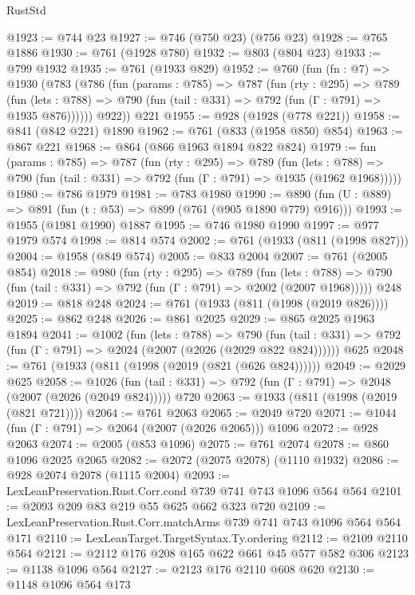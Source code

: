 \begin{lexlean}{RustStd}
\begin{coremodule}
@1923 := @744 @23
@1927 := @746 (@750 @23) (@756 @23)
@1928 := @765 @1886
@1930 := @761 (@1928 @780)
@1932 := @803 (@804 @23)
@1933 := @799 @1932
@1935 := @761 (@1933 @829)
@1952 := @760
    (fun (fn : @7) =>
    @1930
      (@783
        (@786
          (fun (params : @785) =>
          @787
            (fun (rty : @295) =>
            @789
              (fun (lets : @788) =>
              @790 (fun (tail : @331) => @792 (fun (Γ : @791) => @1935 @876))))))
        @922))
    @221
@1955 := @928 (@1928 (@778 @221))
@1958 := @841 (@842 @221) @1890
@1962 := @761 (@833 (@1958 @850) @854)
@1963 := @867 @221
@1968 := @864 (@866 @1963 @1894 @822 @824)
@1979 := fun (params : @785) =>
  @787
    (fun (rty : @295) =>
    @789
      (fun (lets : @788) =>
      @790 (fun (tail : @331) => @792 (fun (Γ : @791) => @1935 (@1962 @1968)))))
@1980 := @786 @1979
@1981 := @783 @1980
@1990 := @890 (fun (U : @889) => @891 (fun (t : @53) => @899 (@761 (@905 @1890 @779) @916)))
@1993 := @1955 (@1981 @1990) @1887
@1995 := @746 @1980 @1990
@1997 := @977 @1979 @574
@1998 := @814 @574
@2002 := @761 (@1933 (@811 (@1998 @827)))
@2004 := @1958 (@849 @574)
@2005 := @833 @2004
@2007 := @761 (@2005 @854)
@2018 := @980
    (fun (rty : @295) =>
    @789
      (fun (lets : @788) =>
      @790 (fun (tail : @331) => @792 (fun (Γ : @791) => @2002 (@2007 @1968)))))
    @248
@2019 := @818 @248
@2024 := @761 (@1933 (@811 (@1998 (@2019 @826))))
@2025 := @862 @248
@2026 := @861 @2025
@2029 := @865 @2025 @1963 @1894
@2041 := @1002
    (fun (lets : @788) =>
    @790 (fun (tail : @331) => @792 (fun (Γ : @791) => @2024 (@2007 (@2026 (@2029 @822 @824))))))
    @625
@2048 := @761 (@1933 (@811 (@1998 (@2019 (@821 (@626 @824))))))
@2049 := @2029 @625
@2058 := @1026
    (fun (tail : @331) => @792 (fun (Γ : @791) => @2048 (@2007 (@2026 (@2049 @824)))))
    @720
@2063 := @1933 (@811 (@1998 (@2019 (@821 @721))))
@2064 := @761 @2063
@2065 := @2049 @720
@2071 := @1044 (fun (Γ : @791) => @2064 (@2007 (@2026 @2065))) @1096
@2072 := @928 @2063
@2074 := @2005 (@853 @1096)
@2075 := @761 @2074
@2078 := @860 @1096 @2025 @2065
@2082 := @2072 (@2075 @2078) (@1110 @1932)
@2086 := @928 @2074 @2078 (@1115 @2004)
@2093 := LexLeanPreservation.Rust.Corr.cond @739 @741 @743 @1096 @564 @564
@2101 := @2093 @209 @83 @219 @55 @625 @662 @323 @720
@2109 := LexLeanPreservation.Rust.Corr.matchArms @739 @741 @743 @1096 @564 @564 @171
@2110 := LexLeanTarget.TargetSyntax.Ty.ordering
@2112 := @2109 @2110 @564
@2121 := @2112 @176 @208 @165 @622 @661 @45 @577 @582 @306
@2123 := @1138 @1096 @564
@2127 := @2123 @176 @2110 @608 @620
@2130 := @1148 @1096 @564 @173

\end{coremodule}
\end{lexlean}
